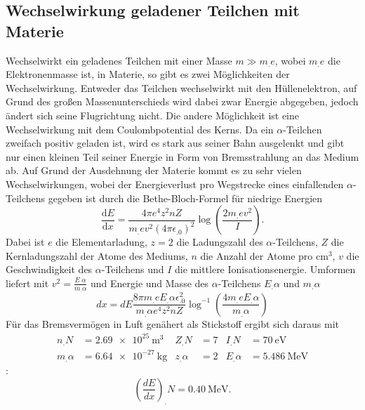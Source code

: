 \subsection{Wechselwirkung geladener Teilchen mit Materie}
\noindent Wechselwirkt ein geladenes Teilchen mit einer Masse $m\gg m_.e$, wobei $m_.e$ die Elektronenmasse ist, in Materie, so gibt es zwei Möglichkeiten der Wechselwirkung.
Entweder das Teilchen wechselwirkt mit den Hüllenelektron, auf Grund des großen Massenunterschieds wird dabei zwar Energie abgegeben, jedoch ändert sich seine Flugrichtung nicht. Die andere Möglichkeit ist eine Wechselwirkung mit dem Coulombpotential des Kerns. Da ein $\alpha$-Teilchen zweifach positiv geladen ist, wird es stark aus seiner Bahn ausgelenkt und gibt nur einen kleinen Teil seiner Energie in Form von Bremsstrahlung an das Medium ab.
Auf Grund der Ausdehnung der Materie kommt es zu sehr vielen Wechselwirkungen, wobei der Energieverlust pro Wegstrecke eines einfallenden $\alpha$-Teilchens gegeben ist durch die Bethe-Bloch-Formel für niedrige Energien
\begin{equation}
\frac{\mathrm{d}E}{\mathrm{d}x}=\frac{4\pi e^4z^2n Z}{m_.ev^2(4\pi\epsilon_.0)^2}\log{\left(\frac{2m_.ev^2}{I}\right)}\text{.}\label{eq:BBF}
\end{equation} 
Dabei ist $e$ die Elementarladung, $z=2$ die Ladungszahl des $\alpha$-Teilchens, $Z$ die Kernladungszahl der Atome des Mediums, $n$ die Anzahl der Atome pro $\si{\centi\meter^3}$, $v$ die Geschwindigkeit des $\alpha$-Teilchens und $I$ die mittlere Ionisationsenergie.
Umformen liefert mit $v^2=\frac{E_.{\alpha}}{m_.{\alpha}}$ und Energie und Masse des $\alpha$-Teilchens $E_.{\alpha}$ und $m_.{\alpha}$
\begin{equation}
dx=dE\frac{8\pi m_.e E_.{\alpha}\epsilon^2_.0}{m_.{\alpha}e^4z^2nZ}\log^{-1}\left(\frac{4m_.e E_.{\alpha}}{m_.{\alpha}}\right)\label{eq:dx}
\end{equation}
Für das Bremsvermögen in Luft genähert als Stickstoff ergibt sich daraus mit
\begin{align*}
n_.N &= \SI{2,69e25}{\metre^3} & Z_.N&=7 & I_.N&=\SI{70}{\electronvolt}\\
m_.{\alpha}&=\SI{6,64e-27}{\kilo\gram} & z_.{\alpha}&=2 & E_.{\alpha}&=\SI{5,486}{\mega\electronvolt}
\end{align*}:
\begin{equation*}
\left(\frac{dE}{dx}\right)_.{N}=\SI{0,40}{\mega\electronvolt}\text{.}
\end{equation*}
